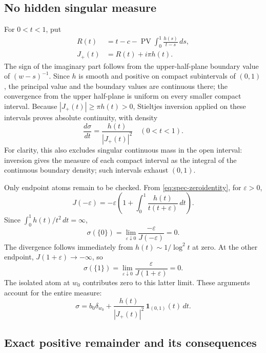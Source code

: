 \subsection{No hidden singular measure}

For $0<t<1$, put
\begin{align}
 R(t)&=t-c-\operatorname{PV}\int_0^1\frac{h(s)}{t-s}\,ds,\\
 J_+(t)&=R(t)+i\pi h(t).
 \label{eq:spec-boundary}
\end{align}
The sign of the imaginary part follows from the upper-half-plane
boundary value of $(w-s)^{-1}$.  Since $h$ is smooth and positive
on compact subintervals of $(0,1)$, the principal value and the
boundary values are continuous there; the convergence from the upper
half-plane is uniform on every smaller compact interval.  Because
$|J_+(t)|\ge\pi h(t)>0$, Stieltjes inversion applied on these
intervals proves absolute continuity, with density
\begin{equation}
 \frac{d\sigma}{dt}=\frac{h(t)}{|J_+(t)|^2}
 \quad(0<t<1).
 \label{eq:spec-density}
\end{equation}
For clarity, this also excludes singular continuous mass in the open
interval: inversion gives the measure of each compact interval as the
integral of the continuous boundary density; such intervals exhaust
$(0,1)$.

Only endpoint atoms remain to be checked.  From
\eqref{eq:spec-zeroidentity}, for $\varepsilon>0$,
\[
 J(-\varepsilon)
 =-\varepsilon\left(1+\int_0^1
            \frac{h(t)}{t(t+\varepsilon)}\,dt\right).
\]
Since $\int_0^1h(t)/t^2\,dt=\infty$,
\begin{equation}
 \sigma(\{0\})
 =\lim_{\varepsilon\downarrow0}\frac{-\varepsilon}{J(-\varepsilon)}=0.
 \label{eq:spec-nozero}
\end{equation}
The divergence follows immediately from
$h(t)\sim1/\log^2t$ at zero.  At the other endpoint,
$J(1+\varepsilon)\to-\infty$, so
\begin{equation}
 \sigma(\{1\})
 =\lim_{\varepsilon\downarrow0}\frac{\varepsilon}{J(1+\varepsilon)}=0.
 \label{eq:spec-noone}
\end{equation}
The isolated atom at $w_0$ contributes zero to this latter limit.
These arguments account for the entire measure:
\begin{equation}
 \sigma=b_0\delta_{w_0}
 +\frac{h(t)}{|J_+(t)|^2}\,\mathbf1_{(0,1)}(t)\,dt.
 \label{eq:spec-fullmeasure}
\end{equation}

\subsection{Exact positive remainder and its consequences}

